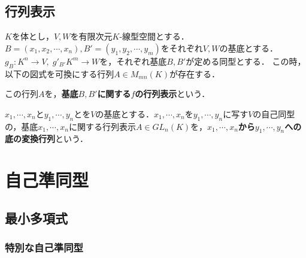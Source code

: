 \documentclass[uplatex, dvipdfmx]{jsreport}
\begin{document}
\section{行列表示}

\begin{shadebox}\begin{definition}
    $K$を体とし，$V,W$を有限次元$K$-線型空間とする．$B=(x_1,x_2,\cdots,x_n), B'=(y_1,y_2,\cdots,y_m)$をそれぞれ$V,W$の基底とする．$g_B:K^n\longrightarrow V,\; g'_{B'}K^m\longrightarrow W$を，それぞれ基底$B,B'$が定める同型とする．
    この時，以下の図式を可換にする行列$A\in M_{mn}(K)$が存在する．
    \begin{center}\end{center}
    この行列$A$を，\textbf{基底$B,B'$に関する$f$の行列表示}という．
\end{definition}\end{shadebox}

\begin{definition}
    $x_1,\cdots,x_n$と$y_1,\cdots,y_n$とを$V$の基底とする．$x_1,\cdots,x_n$を$y_1,\cdots,y_n$に写す$V$の自己同型の，基底$x_1,\cdots,x_n$に関する行列表示$A\in GL_n(K)$を，\textbf{$x_1,\cdots,x_n$から$y_1,\cdots,y_n$への底の変換行列}という．
\end{definition}

\chapter{自己準同型}
\section{最小多項式}
\subsection{特別な自己準同型}
\end{document}
